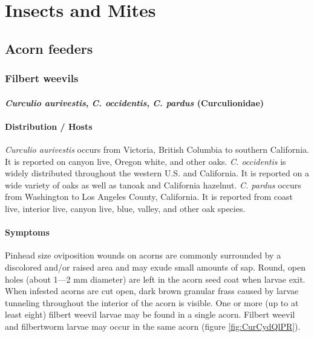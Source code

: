 \documentclass[
]{book}
\begin{document}
\part{Insects and Mites}\label{part-insects-and-mites}

\chapter{Acorn feeders}\label{Acorninsect}

\section*{Filbert weevils}\label{Filberweevils}

\subsection*{\texorpdfstring{\emph{Curculio aurivestis}, \emph{C. occidentis}, \emph{C. pardus} (Curculionidae)}{Curculio aurivestis, C. occidentis, C. pardus (Curculionidae)}}\label{curculio-aurivestis-c.-occidentis-c.-pardus-curculionidae}

\subsection*{Distribution / Hosts}\label{distribution-hosts}

\emph{Curculio aurivestis} occurs from Victoria, British Columbia to southern California. It is reported on canyon live, Oregon white, and other oaks.
\emph{C. occidentis} is widely distributed throughout the western U.S. and California. It is reported on a wide variety of oaks as well as tanoak and California hazelnut.
\emph{C. pardus} occurs from Washington to Los Angeles County, California. It is reported from coast live, interior live, canyon live, blue, valley, and other oak species.

\subsection*{Symptoms}\label{symptoms}

Pinhead size oviposition wounds on acorns are commonly surrounded by a discolored and/or raised area and may exude small amounts of sap. Round, open holes (about 1---2 mm diameter) are left in the acorn seed coat when larvae exit. When infested acorns are cut open, dark brown granular frass caused by larvae tunneling throughout the interior of the acorn is visible. One or more (up to at least eight) filbert weevil larvae may be found in a single acorn. Filbert weevil and filbertworm larvae may occur in the same acorn (figure \ref{fig:CurCydQlPR}).
\end{document}
